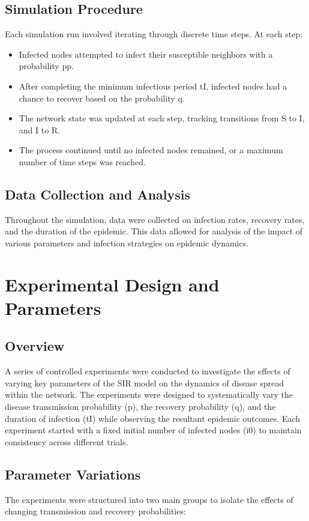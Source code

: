 \documentclass[
	report, %
	11pt, %
]{CSUniSchoolLabReport}
\newcounter{ct}
\begin{document}
\subsection{Simulation Procedure}
Each simulation run involved iterating through discrete time steps. At each step:
\begin{itemize}
	\item Infected nodes attempted to infect their susceptible neighbors with a probability pp.
	\item After completing the minimum infectious period tI, infected nodes had a chance to recover based on the probability q.
	\item The network state was updated at each step, tracking transitions from S to I, and I to R.
	\item The process continued until no infected nodes remained, or a maximum number of time steps was reached.
\end{itemize}

\subsection{Data Collection and Analysis}
Throughout the simulation, data were collected on infection rates, recovery rates, and the duration of the epidemic. This data allowed for analysis of the impact of various parameters and infection strategies on epidemic dynamics.

\section{Experimental Design and Parameters}

\subsection{Overview}
A series of controlled experiments were conducted to investigate the effects of varying key parameters of the SIR model on the dynamics of disease spread within the network. The experiments were designed to systematically vary the disease transmission probability (p), the recovery probability (q), and the duration of infection (tI) while observing the resultant epidemic outcomes. Each experiment started with a fixed initial number of infected nodes (i0) to maintain consistency across different trials.

\subsection{Parameter Variations}
The experiments were structured into two main groups to isolate the effects of changing transmission and recovery probabilities:
\end{document}
